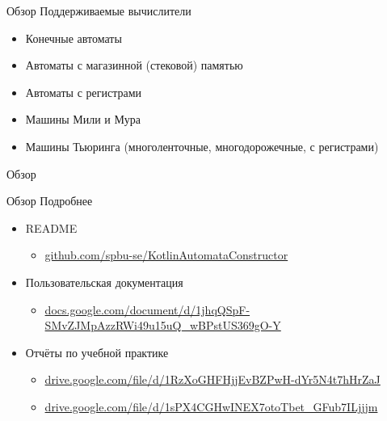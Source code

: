 \documentclass[xetex,mathserif,serif]{beamer}
\begin{document}
        \begin{frame}{Обзор}
            Поддерживаемые вычислители
            \begin{itemize}
                \item Конечные автоматы
                \item Автоматы с магазинной (стековой) памятью
                \item Автоматы с регистрами
                \item Машины Мили и Мура
                \item Машины Тьюринга (многоленточные, многодорожечные, с регистрами)
            \end{itemize}
        \end{frame}
        
        \begin{frame}{Обзор}
        \end{frame}
        
        \begin{frame}{Обзор}
            Подробнее
            \begin{itemize}
                \item README
                    \begin{itemize}
                        \item \url{github.com/spbu-se/KotlinAutomataConstructor}
                    \end{itemize}
                \item Пользовательская документация
                    \begin{itemize}
                        \item \url{docs.google.com/document/d/1jhqQSpF-SMvZJMpAzzRWi49u15uQ_wBPstUS369gO-Y}
                    \end{itemize}
                \item Отчёты по учебной практике
                    \begin{itemize}
                        \item \url{drive.google.com/file/d/1RzXoGHFHjjEvBZPwH-dYr5N4t7hHrZaJ}
                        \item \url{drive.google.com/file/d/1sPX4CGHwINEX7otoTbet_GFub7ILjjjm}
                    \end{itemize}
            \end{itemize}
        \end{frame}
        
\end{document}
